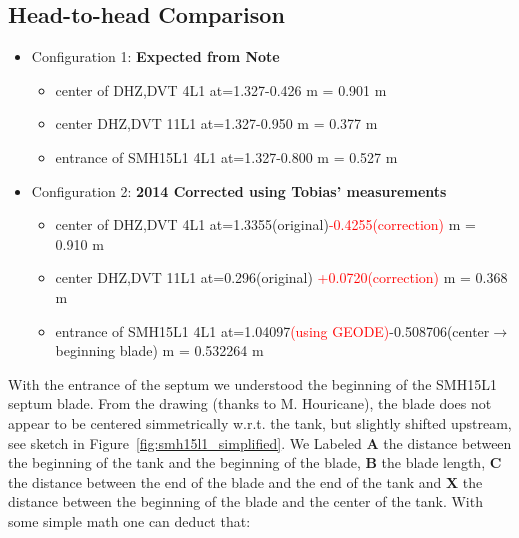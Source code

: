 \documentclass[11pt,letter,english]{article}
\begin{document}
\subsection*{Head-to-head Comparison}

\begin{itemize}

\item Configuration 1: {\bf Expected from Note}
  \begin{itemize}
  \item center of DHZ,DVT 4L1   at=1.327-0.426 m = 0.901 m 
  \item center DHZ,DVT 11L1     at=1.327-0.950 m = 0.377 m 
  \item entrance of SMH15L1 4L1 at=1.327-0.800 m = 0.527 m 
  \end{itemize}

\item Configuration 2: {\bf 2014 Corrected using Tobias' measurements}
  \begin{itemize}
  \item center of DHZ,DVT 4L1   at=1.3355(original)\textcolor{red}{-0.4255(correction)} m = 0.910 m 
  \item center DHZ,DVT 11L1     at=0.296(original) \textcolor{red}{+0.0720(correction)} m = 0.368 m 
  \item entrance of SMH15L1 4L1 at=1.04097\textcolor{red}{(using GEODE)}-0.508706(center$\to$beginning blade) m = 0.532264 m 
  \end{itemize}

\end{itemize}


With the entrance of the septum we understood the beginning of the SMH15L1
septum blade.  From the drawing (thanks to M. Houricane), the blade does not
appear to be centered simmetrically w.r.t. the tank, but slightly shifted
upstream, see sketch in Figure~\ref{fig:smh15l1_simplified}. We Labeled {\bf A}
the distance between the beginning of the tank and the beginning of the
blade, {\bf B} the blade length, {\bf C} the distance between the end of the
blade and the end of the tank and {\bf X} the distance between the beginning of
the blade and the center of the tank. With some simple math one can deduct that:
\end{document}
